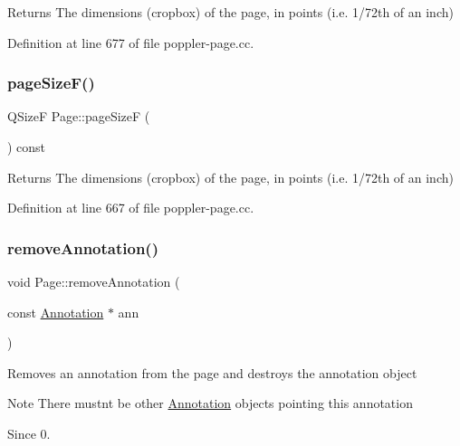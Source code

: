 \begin{DoxyReturn}{Returns}
The dimensions (cropbox) of the page, in points (i.\+e. 1/72th of an inch) 
\end{DoxyReturn}


Definition at line 677 of file poppler-\/page.\+cc.

\mbox{\label{class_poppler_1_1_page_a2493727bf6c299a6ce2bd9e1387417bd}} 
\subsubsection{\texorpdfstring{page\+Size\+F()}{pageSizeF()}}
{\footnotesize\ttfamily Q\+SizeF Page\+::page\+SizeF (\begin{DoxyParamCaption}{ }\end{DoxyParamCaption}) const}

\begin{DoxyReturn}{Returns}
The dimensions (cropbox) of the page, in points (i.\+e. 1/72th of an inch) 
\end{DoxyReturn}


Definition at line 667 of file poppler-\/page.\+cc.

\mbox{\label{class_poppler_1_1_page_af9f03e0b230b3f432a7f4672d3403a0f}} 
\subsubsection{\texorpdfstring{remove\+Annotation()}{removeAnnotation()}}
{\footnotesize\ttfamily void Page\+::remove\+Annotation (\begin{DoxyParamCaption}\item[{const \hyperlink{class_poppler_1_1_annotation}{Annotation} $\ast$}]{ann }\end{DoxyParamCaption})}

Removes an annotation from the page and destroys the annotation object

\begin{DoxyNote}{Note}
There mustn\textquotesingle{}t be other \hyperlink{class_poppler_1_1_annotation}{Annotation} objects pointing this annotation 
\end{DoxyNote}
\begin{DoxySince}{Since}
0. 
\end{DoxySince}


